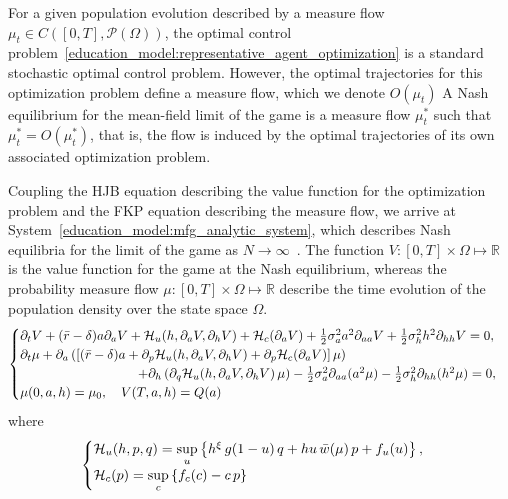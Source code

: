 For a given population evolution described by a measure flow $\mu_t \in C([0,T],\mathcal{P}(\Omega))$, the optimal control problem~\eqref{education_model:representative_agent_optimization} is a standard stochastic optimal control problem.
However, the optimal trajectories for this optimization problem define a measure flow, which we denote $O(\mu_t)$   
A Nash equilibrium for the mean-field limit of the game is a measure flow $\mu^*_t$ such that $ \mu^*_t = O(\mu^*_t)$, that is, the flow is induced by the optimal trajectories of its own associated optimization problem.

Coupling the HJB equation describing the value function for the optimization problem and the FKP equation describing the measure flow, we arrive at System~\eqref{education_model:mfg_analytic_system}, which describes Nash equilibria for the limit of the game as $N \to \infty$~\cite{cardaliaguet2010notes}.
The function $V: [0,T] \times \Omega \mapsto \mathbb{R}$ is the value function for the game at the Nash equilibrium,
whereas the probability measure flow $\mu: [0,T] \times \Omega \mapsto \mathbb{R}$ describe the time evolution of the  population density over the state space $\Omega$.
\begin{equation}\label{education_model:mfg_analytic_system}
    \begin{cases}
        \partial_t V + (\bar r  - \delta) a \partial_a V + \mathcal{H}_u(h, \partial_a V, \partial_h V)  + \mathcal{H}_c(\partial_a V) + \frac{1}{2} \sigma_a^2 a^2 \partial_{aa} V + \frac{1}{2} \sigma^2_h h^2 \partial_{hh} V = 0,\\
        \partial_t \mu + \partial_a \left( \left[ (\bar r - \delta) a + \partial_p \mathcal{H}_u(h, \partial_a V, \partial_h V) + \partial_p \mathcal{H}_c(\partial_a V) \right] \mu \right) 
        \\ \quad \quad \quad \quad \quad \quad \quad \quad \quad + \partial_h \left( \partial_q \mathcal{H}_u(h, \partial_a V, \partial_h V)\, \mu\right)  - \frac{1}{2} \sigma_a^2 \partial_{aa} (a^2\mu) - \frac{1}{2} \sigma^2_h \partial_{hh} (h^2\mu) = 0,\\
        \mu(0,a,h) = \mu_0,\quad V(T,a,h) = Q(a)
    \end{cases}
\end{equation}
where
\begin{equation}
    \begin{cases}
        \mathcal{H}_u(h,p,q) = \sup\limits_{u} \left \{ h^\xi \, g(1 - u)\, q + h u \, \bar w (\mu)\, p + f_u(u)\right\},\\
        \mathcal{H}_c(p) = \sup\limits_{c} \left \{  f_c(c) - c \, p \right \}
    \end{cases}
\end{equation}

